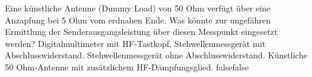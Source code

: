    {Eine künstliche Antenne (Dummy Load) von 50 Ohm verfügt über eine Anzapfung bei 5 Ohm vom erdnahen Ende. Was könnte zur ungefähren Ermittlung der Senderausgangsleistung über diesen Messpunkt eingesetzt werden?}
    {Digitalmultimeter mit HF-Tastkopf.}
    {Stehwellenmessgerät mit Abschlusswiderstand.}
    {Stehwellenmessgerät ohne Abschlusswiderstand.}
    {Künstliche 50 Ohm-Antenne mit zusätzlichem HF-Dämpfungsglied.}
    {false}{false}